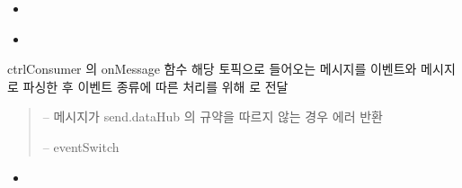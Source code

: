 \documentclass[a4paper,10pt,english]{sphinxmanual}
\begin{document}
\begin{fulllineitems}
\begin{fulllineitems}
\begin{itemize}
\item {} 
\sphinxAtStartPar
{\hyperref[\detokenize{_DHDaemon:DHDaemon._smUpdateInterestTopic}]{}}

\item {} 
\sphinxAtStartPar
{\hyperref[\detokenize{_DHDaemon:DHDaemon._smSyncOn}]{}}

\end{itemize}



\end{fulllineitems}


\begin{fulllineitems}
\label{\detokenize{_ctrlKafka:ctrlConsumer.onMessage}}
\pysigstartsignatures
{}
\pysigstopsignatures
\sphinxAtStartPar
ctrlConsumer 의 onMessage 함수
해당 토픽으로 들어오는 메시지를 이벤트와 메시지로 파싱한 후 이벤트 종류에 따른 처리를 위해  로 전달
\begin{quote}\begin{description}
\sphinxAtStartPar
{} – 메시지가 send.dataHub 의 규약을 따르지 않는 경우 에러 반환

\sphinxAtStartPar
{} – eventSwitch

\end{description}\end{quote}


\nopagebreak

\begin{itemize}
\item {} 
\sphinxAtStartPar
{\hyperref[\detokenize{_ctrlKafka:ctrlConsumer.eventSwitch}]{}}

\end{itemize}



\end{fulllineitems}


\end{fulllineitems}
\end{document}
